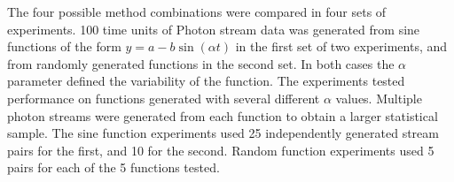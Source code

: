 \documentclass[a4paper,11pt]{article}
\begin{document}
  The four possible method combinations were compared in four sets of
  experiments. 100 time units of Photon stream data was generated from sine
  functions of the form $y=a-b\sin(\alpha t)$ in the first set of two
  experiments, and from randomly generated functions in the second set. In both
  cases the $\alpha$ parameter defined the variability of the function. The
  experiments tested performance on functions generated with several different
  $\alpha$ values. Multiple photon streams were generated from each function to
  obtain a larger statistical sample. The sine function experiments used 25
  independently generated stream pairs for the first, and 10 for the
  second. Random function experiments used 5 pairs for each of the 5 functions
  tested.
    \begin{figure}[]
    \\


\end{figure}
\end{document}
